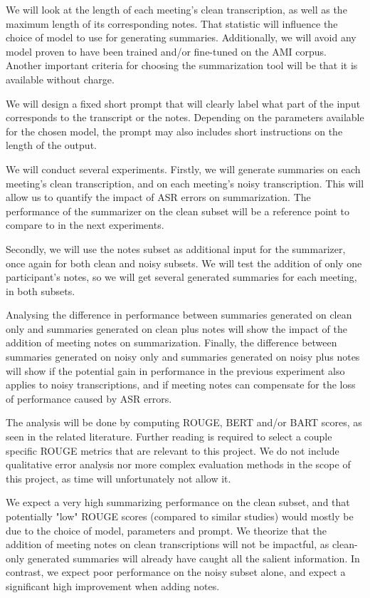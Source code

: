 \documentclass[11pt]{article}
\begin{document}
We will look at the length of each meeting's clean transcription, as well as the maximum length of its corresponding notes.
That statistic will influence the choice of model to use for generating summaries.
Additionally, we will avoid any model proven to have been trained and/or fine-tuned on the AMI corpus.
Another important criteria for choosing the summarization tool will be that it is available without charge.

We will design a fixed short prompt that will clearly label what part of the input corresponds to the transcript or the notes.
Depending on the parameters available for the chosen model, the prompt may also includes short instructions on the length of the output.

We will conduct several experiments.
Firstly, we will generate summaries on each meeting's clean transcription, and on each meeting's noisy transcription.
This will allow us to quantify the impact of ASR errors on summarization.
The performance of the summarizer on the clean subset will be a reference point to compare to in the next experiments.

Secondly, we will use the notes subset as additional input for the summarizer, once again for both clean and noisy subsets.
We will test the addition of only one participant's notes, so we will get several generated summaries for each meeting, in both subsets.

Analysing the difference in performance between summaries generated on clean only and summaries generated on clean plus notes will show the impact of the addition of meeting notes on summarization.
Finally, the difference between summaries generated on noisy only and summaries generated on noisy plus notes will show if the potential gain in performance in the previous experiment also applies to noisy transcriptions, and if meeting notes can compensate for the loss of performance caused by ASR errors.

The analysis will be done by computing ROUGE, BERT and/or BART scores, as seen in the related literature.
Further reading is required to select a couple specific ROUGE metrics that are relevant to this project.
We do not include qualitative error analysis nor more complex evaluation methods in the scope of this project, as time will unfortunately not allow it.

We expect a very high summarizing performance on the clean subset, and that potentially "low" ROUGE scores (compared to similar studies) would mostly be due to the choice of model, parameters and prompt.
We theorize that the addition of meeting notes on clean transcriptions will not be impactful, as clean-only generated summaries will already have caught all the salient information.
In contrast, we expect poor performance on the noisy subset alone, and expect a significant high improvement when adding notes.
\end{document}
